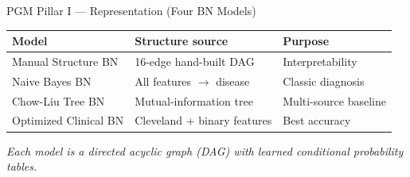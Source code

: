 \documentclass[aspectratio=169,11pt]{beamer}
\begin{document}
\begin{frame}{PGM Pillar I --- Representation (Four BN Models)}
  \begin{table}
    \centering
    \begin{tabular}{@{}lll@{}}
      \toprule
      \textbf{Model} & \textbf{Structure source} & \textbf{Purpose} \\
      \midrule
      Manual Structure BN & 16-edge hand-built DAG & Interpretability \\
      Naive Bayes BN & All features $\rightarrow$ disease & Classic diagnosis \\
      Chow-Liu Tree BN & Mutual-information tree & Multi-source baseline \\
      Optimized Clinical BN & Cleveland + binary features & Best accuracy \\
      \bottomrule
    \end{tabular}
  \end{table}
  \vspace{0.6em}
  \begin{center}
    \textit{Each model is a directed acyclic graph (DAG) with learned conditional probability tables.}
  \end{center}
\end{frame}
\end{document}
